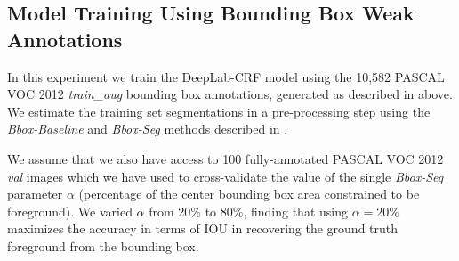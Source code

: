 \subsection{Model Training Using Bounding Box Weak Annotations}
\label{sec:test_bbox}

\begin{table}[tbp!]
  \centering
  \caption{DeepLab-CRF VOC 2012 \textsl{val} IOU (\%) results
    using bounding box weak annotations \vs strong annotation
    ().}
  \label{tb:bbox_annot}
  \vspace{-.5cm}
\end{table}

\begin{table}[tbp!]
  \centering
  \caption{DeepLab-CRF VOC \textsl{val} IOU (\%) results with
    image-level weak annotations in training \vs previous methods
    ().}
  \label{tb:weak_annot}
  \vspace{-0.5cm}
\end{table}

In this experiment we train the DeepLab-CRF model using the 10,582
PASCAL VOC 2012 \textsl{train\_aug} bounding box annotations,
generated as described in  above. We estimate the
training set segmentations in a pre-processing step using the
\textsl{Bbox-Baseline} and \textsl{Bbox-Seg} methods described in
.

We assume that we also have access to 100 fully-annotated PASCAL VOC
2012 \textsl{val} images which we have used to cross-validate the
value of the single \textsl{Bbox-Seg} parameter $\alpha$ (percentage
of the center bounding box area constrained to be foreground). We
varied $\alpha$ from 20\% to 80\%, finding that using $\alpha = 20\%$
maximizes the accuracy in terms of IOU in recovering the ground truth
foreground from the bounding box.


